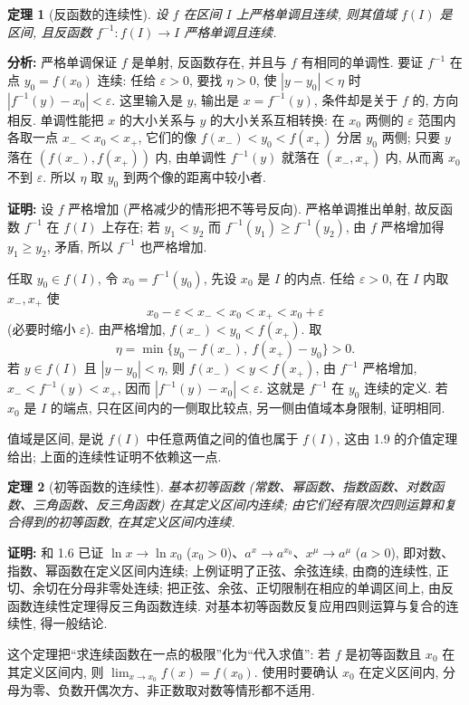 \documentclass[UTF8,openany]{ctexbook}
\theoremstyle{chinesetextbook}
\newtheorem{theorem}{定理}[section]
\newenvironment{cnproof}{\par\indent\textbf{证明:} \ignorespaces}{\par}
\begin{document}
\begin{theorem}[反函数的连续性]
设 $f$ 在区间 $I$ 上严格单调且连续, 则其值域 $f(I)$ 是区间, 且反函数 $f^{-1}:f(I)\to I$ 严格单调且连续.
\end{theorem}
\par\indent\textbf{分析:} 严格单调保证 $f$ 是单射, 反函数存在, 并且与 $f$ 有相同的单调性. 要证 $f^{-1}$ 在点 $y_0=f(x_0)$ 连续: 任给 $\varepsilon>0$, 要找 $\eta>0$, 使 $|y-y_0|<\eta$ 时 $|f^{-1}(y)-x_0|<\varepsilon$. 这里输入是 $y$, 输出是 $x=f^{-1}(y)$, 条件却是关于 $f$ 的, 方向相反. 单调性能把 $x$ 的大小关系与 $y$ 的大小关系互相转换: 在 $x_0$ 两侧的 $\varepsilon$ 范围内各取一点 $x_-<x_0<x_+$, 它们的像 $f(x_-)<y_0<f(x_+)$ 分居 $y_0$ 两侧; 只要 $y$ 落在 $(f(x_-),f(x_+))$ 内, 由单调性 $f^{-1}(y)$ 就落在 $(x_-,x_+)$ 内, 从而离 $x_0$ 不到 $\varepsilon$. 所以 $\eta$ 取 $y_0$ 到两个像的距离中较小者.
\begin{cnproof}
设 $f$ 严格增加 (严格减少的情形把不等号反向). 严格单调推出单射, 故反函数 $f^{-1}$ 在 $f(I)$ 上存在; 若 $y_1<y_2$ 而 $f^{-1}(y_1)\ge f^{-1}(y_2)$, 由 $f$ 严格增加得 $y_1\ge y_2$, 矛盾, 所以 $f^{-1}$ 也严格增加.

任取 $y_0\in f(I)$, 令 $x_0=f^{-1}(y_0)$, 先设 $x_0$ 是 $I$ 的内点. 任给 $\varepsilon>0$, 在 $I$ 内取 $x_-,x_+$ 使
\[
x_0-\varepsilon<x_-<x_0<x_+<x_0+\varepsilon
\]
(必要时缩小 $\varepsilon$). 由严格增加, $f(x_-)<y_0<f(x_+)$. 取
\[
\eta=\min\{y_0-f(x_-),\ f(x_+)-y_0\}>0.
\]
若 $y\in f(I)$ 且 $|y-y_0|<\eta$, 则 $f(x_-)<y<f(x_+)$, 由 $f^{-1}$ 严格增加, $x_-<f^{-1}(y)<x_+$, 因而 $|f^{-1}(y)-x_0|<\varepsilon$. 这就是 $f^{-1}$ 在 $y_0$ 连续的定义. 若 $x_0$ 是 $I$ 的端点, 只在区间内的一侧取比较点, 另一侧由值域本身限制, 证明相同.

值域是区间, 是说 $f(I)$ 中任意两值之间的值也属于 $f(I)$, 这由 1.9 的介值定理给出; 上面的连续性证明不依赖这一点.
\end{cnproof}
\begin{theorem}[初等函数的连续性]
基本初等函数 (常数、幂函数、指数函数、对数函数、三角函数、反三角函数) 在其定义区间内连续; 由它们经有限次四则运算和复合得到的初等函数, 在其定义区间内连续.
\end{theorem}
\begin{cnproof}
1.5 和 1.6 已证 $\ln x\to\ln x_0$ ($x_0>0$)、$a^x\to a^{x_0}$、$x^\mu\to a^\mu$ ($a>0$), 即对数、指数、幂函数在定义区间内连续; 上例证明了正弦、余弦连续, 由商的连续性, 正切、余切在分母非零处连续; 把正弦、余弦、正切限制在相应的单调区间上, 由反函数连续性定理得反三角函数连续. 对基本初等函数反复应用四则运算与复合的连续性, 得一般结论.
\end{cnproof}
这个定理把“求连续函数在一点的极限”化为“代入求值”: 若 $f$ 是初等函数且 $x_0$ 在其定义区间内, 则 $\displaystyle\lim_{x\to x_0}f(x)=f(x_0)$. 使用时要确认 $x_0$ 在定义区间内, 分母为零、负数开偶次方、非正数取对数等情形都不适用.
\end{document}
